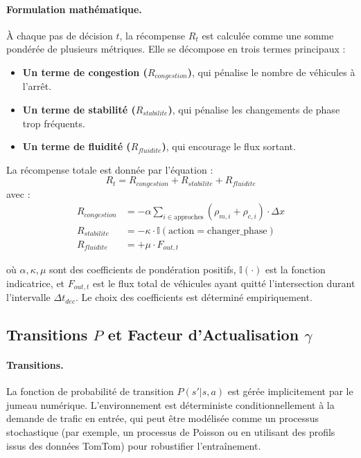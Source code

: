 \paragraph{Formulation mathématique.} À chaque pas de décision $t$, la récompense $R_t$ est calculée comme une somme pondérée de plusieurs métriques.
Elle se décompose en trois termes principaux :
\begin{itemize}
    \item \textbf{Un terme de congestion ($R_{congestion}$)}, qui pénalise le nombre de véhicules à l'arrêt.
    \item \textbf{Un terme de stabilité ($R_{stabilite}$)}, qui pénalise les changements de phase trop fréquents.
    \item \textbf{Un terme de fluidité ($R_{fluidite}$)}, qui encourage le flux sortant.
\end{itemize}
La récompense totale est donnée par l'équation :
\begin{equation}
R_t = R_{congestion} + R_{stabilite} + R_{fluidite}
\end{equation}
avec :
\begin{align}
R_{congestion} &= - \alpha \sum_{i \in \text{approches}} (\rho_{m,i} + \rho_{c,i}) \cdot \Delta x \\
R_{stabilite} &= - \kappa \cdot \mathbb{I}(\text{action} = \text{changer\_phase}) \\
R_{fluidite} &= + \mu \cdot F_{out, t}
\end{align}

où $\alpha, \kappa, \mu$ sont des coefficients de pondération positifs, $\mathbb{I}(\cdot)$ est la fonction indicatrice, et $F_{out, t}$ est le flux total de véhicules ayant quitté l'intersection durant l'intervalle $\Delta t_{dec}$. Le choix des coefficients est déterminé empiriquement.

\subsection{Transitions $P$ et Facteur d'Actualisation $\gamma$}
\label{subsec:transitions_gamma}

\paragraph{Transitions.} La fonction de probabilité de transition $P(s'|s,a)$ est gérée implicitement par le jumeau numérique. L'environnement est déterministe conditionnellement à la demande de trafic en entrée, qui peut être modélisée comme un processus stochastique (par exemple, un processus de Poisson ou en utilisant des profils issus des données TomTom) pour robustifier l'entraînement.

